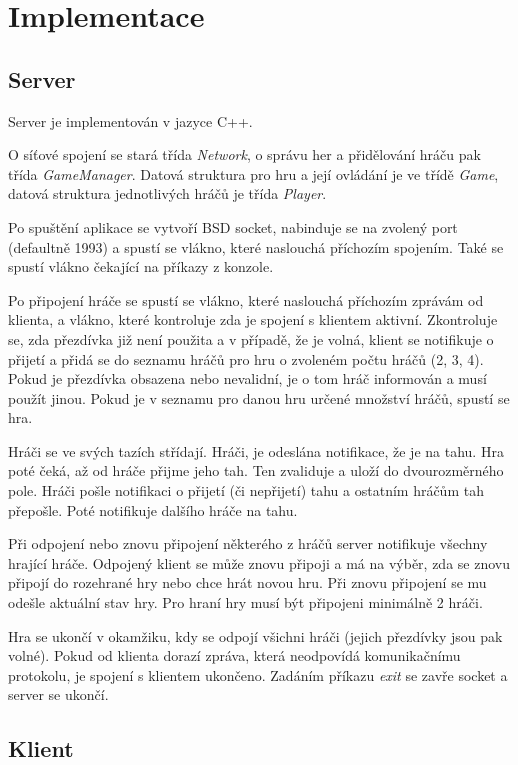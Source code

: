 \chapter{Implementace}

\section{Server}

Server je implementován v jazyce C++.

O síťové spojení se stará třída \emph{Network}, o správu her a přidělování hráču pak třída \emph{GameManager}. Datová struktura pro hru a její ovládání je ve třídě \emph{Game}, datová struktura jednotlivých hráčů je třída \emph{Player}.

Po spuštění aplikace se vytvoří BSD socket, nabinduje se na zvolený port (defaultně 1993) a spustí se vlákno, které naslouchá příchozím spojením. Také se spustí vlákno čekající na příkazy z konzole.

Po připojení hráče se spustí se vlákno, které naslouchá příchozím zprávám od klienta, a vlákno, které kontroluje zda je spojení s klientem aktivní. Zkontroluje se, zda přezdívka již není použita a v případě, že je volná, klient se notifikuje o přijetí a přidá se do seznamu hráčů pro hru o zvoleném počtu hráčů (2, 3, 4). Pokud je přezdívka obsazena nebo nevalidní, je o tom hráč informován a musí použít jinou. Pokud je v seznamu pro danou hru určené množství hráčů, spustí se hra.

Hráči se ve svých tazích střídají. Hráči, je odeslána notifikace, že je na tahu. Hra poté čeká, až od hráče přijme jeho tah. Ten zvaliduje a uloží do dvourozměrného pole. Hráči pošle notifikaci o přijetí (či nepřijetí) tahu a ostatním hráčům tah přepošle. Poté notifikuje dalšího hráče na tahu.

Při odpojení nebo znovu připojení některého z hráčů server notifikuje všechny hrající hráče. Odpojený klient se může znovu připoji a má na výběr, zda se znovu připojí do rozehrané hry nebo chce hrát novou hru. Při znovu připojení se mu odešle aktuální stav hry. Pro hraní hry musí být připojeni minimálně 2 hráči.

Hra se ukončí v okamžiku, kdy se odpojí všichni hráči (jejich přezdívky jsou pak volné). Pokud od klienta dorazí zpráva, která neodpovídá komunikačnímu protokolu, je spojení s klientem ukončeno. Zadáním příkazu \emph{exit} se zavře socket a server se ukončí.

\section{Klient}

